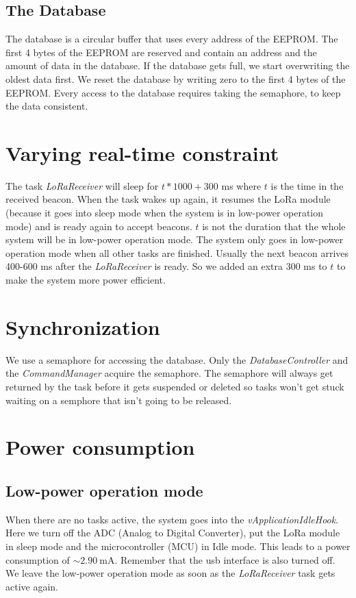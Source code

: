\documentclass{scrartcl}
\begin{document}
\subsection{The Database}
The database is a circular buffer that uses every address of the EEPROM.
The first 4 bytes of the EEPROM are reserved and contain an address and the amount of data in the database.
If the database gets full, we start overwriting the oldest data first.
We reset the database by writing zero to the first 4 bytes of the EEPROM.
Every access to the database requires taking the semaphore, to keep the data consistent.

\section{Varying real-time constraint}
The task \textit{LoRaReceiver} will sleep for $t*1000 + 300$ \si{\milli\second} where $t$ is the time in the received beacon.
When the task wakes up again, it resumes the LoRa module (because it goes into sleep mode when the system is in low-power operation mode)
and is ready again to accept beacons. $t$ is not the duration that the whole system will be in low-power operation mode.
The system only goes in low-power operation mode when all other tasks are finished.
Usually the next beacon arrives 400-600 \si{\milli\second} after the \textit{LoRaReceiver} is ready.
So we added an extra 300 \si{\milli\second} to $t$ to make the system more power efficient.

\newpage

\section{Synchronization}
We use a semaphore for accessing the database. Only the \textit{DatabaseController} and the \textit{CommandManager} acquire the semaphore.
The semaphore will always get returned by the task before it gets suspended or deleted so tasks won't get stuck waiting on a semphore
that isn't going to be released.

\section{Power consumption}
\subsection{Low-power operation mode}
When there are no tasks active, the system goes into the \textit{vApplicationIdleHook}.
Here we turn off the ADC (Analog to Digital Converter),
put the LoRa module in sleep mode and the microcontroller (MCU) in Idle mode.
This leads to a power consumption of $\sim \SI{2.90}{\milli\ampere}$.
Remember that the usb interface is also turned off.
We leave the low-power operation mode as soon as the \textit{LoRaReceiver} task gets active again.
\end{document}
